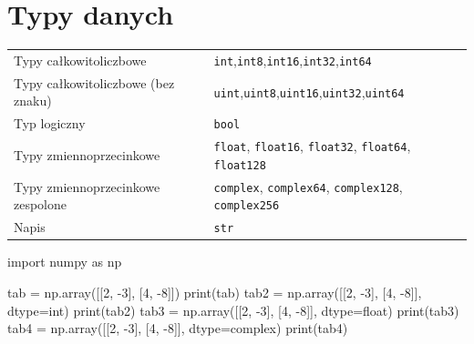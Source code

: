 \documentclass[
  polish,
  letterpaper,
  DIV=11,
  numbers=noendperiod]{scrreprt}
\newenvironment{Shaded}{\begin{snugshade}}{\end{snugshade}}
\newcommand{\BuiltInTok}[1]{\textcolor[rgb]{0.00,0.23,0.31}{#1}}
\newcommand{\DecValTok}[1]{\textcolor[rgb]{0.68,0.00,0.00}{#1}}
\newcommand{\ImportTok}[1]{\textcolor[rgb]{0.00,0.46,0.62}{#1}}
\newcommand{\NormalTok}[1]{\textcolor[rgb]{0.00,0.23,0.31}{#1}}
\newcommand{\OperatorTok}[1]{\textcolor[rgb]{0.37,0.37,0.37}{#1}}
\begin{document}
\chapter{Typy danych}\label{typy-danych}

\begin{longtable}[]{@{}
  >{\raggedright\arraybackslash}p{}
  >{\raggedright\arraybackslash}p{}@{}}
\toprule\noalign{}
\endhead
\bottomrule\noalign{}
\endlastfoot
Typy całkowitoliczbowe &
\texttt{int},\texttt{int8},\texttt{int16},\texttt{int32},\texttt{int64} \\
Typy całkowitoliczbowe (bez znaku) &
\texttt{uint},\texttt{uint8},\texttt{uint16},\texttt{uint32},\texttt{uint64} \\
Typ logiczny & \texttt{bool} \\
Typy zmiennoprzecinkowe & \texttt{float}, \texttt{float16},
\texttt{float32}, \texttt{float64}, \texttt{float128} \\
Typy zmiennoprzecinkowe zespolone & \texttt{complex},
\texttt{complex64}, \texttt{complex128}, \texttt{complex256} \\
Napis & \texttt{str} \\
\end{longtable}

\begin{Shaded}
\begin{Highlighting}[]
\ImportTok{import}\NormalTok{ numpy }\ImportTok{as}\NormalTok{ np}

\NormalTok{tab }\OperatorTok{=}\NormalTok{ np.array([[}\DecValTok{2}\NormalTok{, }\OperatorTok{{-}}\DecValTok{3}\NormalTok{], [}\DecValTok{4}\NormalTok{, }\OperatorTok{{-}}\DecValTok{8}\NormalTok{]])}
\BuiltInTok{print}\NormalTok{(tab)}
\NormalTok{tab2 }\OperatorTok{=}\NormalTok{ np.array([[}\DecValTok{2}\NormalTok{, }\OperatorTok{{-}}\DecValTok{3}\NormalTok{], [}\DecValTok{4}\NormalTok{, }\OperatorTok{{-}}\DecValTok{8}\NormalTok{]], dtype}\OperatorTok{=}\BuiltInTok{int}\NormalTok{)}
\BuiltInTok{print}\NormalTok{(tab2)}
\NormalTok{tab3 }\OperatorTok{=}\NormalTok{ np.array([[}\DecValTok{2}\NormalTok{, }\OperatorTok{{-}}\DecValTok{3}\NormalTok{], [}\DecValTok{4}\NormalTok{, }\OperatorTok{{-}}\DecValTok{8}\NormalTok{]], dtype}\OperatorTok{=}\BuiltInTok{float}\NormalTok{)}
\BuiltInTok{print}\NormalTok{(tab3)}
\NormalTok{tab4 }\OperatorTok{=}\NormalTok{ np.array([[}\DecValTok{2}\NormalTok{, }\OperatorTok{{-}}\DecValTok{3}\NormalTok{], [}\DecValTok{4}\NormalTok{, }\OperatorTok{{-}}\DecValTok{8}\NormalTok{]], dtype}\OperatorTok{=}\BuiltInTok{complex}\NormalTok{)}
\BuiltInTok{print}\NormalTok{(tab4)}
\end{Highlighting}
\end{Shaded}
\end{document}
